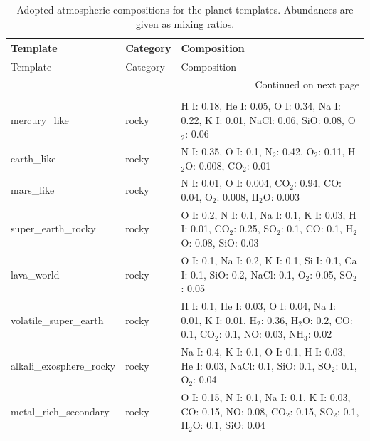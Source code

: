 \begin{longtable}{lll}
\caption{Adopted atmospheric compositions for the planet templates. Abundances are given as mixing ratios.} \\
\toprule
Template & Category & Composition \\
\midrule
\endfirsthead

\toprule
Template & Category & Composition \\
\midrule
\endhead

\midrule
\multicolumn{3}{r}{Continued on next page} \\
\midrule
\endfoot

\bottomrule
\endlastfoot

\multicolumn{3}{l}{\textbf{Rocky / terrestrial templates}} \\
\midrule
mercury\_like & rocky & H I: 0.18, He I: 0.05, O I: 0.34, Na I: 0.22, K I: 0.01, NaCl: 0.06, SiO: 0.08, O$_{2}$: 0.06 \\
earth\_like & rocky & N I: 0.35, O I: 0.1, N$_{2}$: 0.42, O$_{2}$: 0.11, H$_{2}$O: 0.008, CO$_{2}$: 0.01 \\
mars\_like & rocky & N I: 0.01, O I: 0.004, CO$_{2}$: 0.94, CO: 0.04, O$_{2}$: 0.008, H$_{2}$O: 0.003 \\
super\_earth\_rocky & rocky & O I: 0.2, N I: 0.1, Na I: 0.1, K I: 0.03, H I: 0.01, CO$_{2}$: 0.25, SO$_{2}$: 0.1, CO: 0.1, H$_{2}$O: 0.08, SiO: 0.03 \\
lava\_world & rocky & O I: 0.1, Na I: 0.2, K I: 0.1, Si I: 0.1, Ca I: 0.1, SiO: 0.2, NaCl: 0.1, O$_{2}$: 0.05, SO$_{2}$: 0.05 \\
volatile\_super\_earth & rocky & H I: 0.1, He I: 0.03, O I: 0.04, Na I: 0.01, K I: 0.01, H$_{2}$: 0.36, H$_{2}$O: 0.2, CO: 0.1, CO$_{2}$: 0.1, NO: 0.03, NH$_{3}$: 0.02 \\
alkali\_exosphere\_rocky & rocky & Na I: 0.4, K I: 0.1, O I: 0.1, H I: 0.03, He I: 0.03, NaCl: 0.1, SiO: 0.1, SO$_{2}$: 0.1, O$_{2}$: 0.04 \\
metal\_rich\_secondary & rocky & O I: 0.15, N I: 0.1, Na I: 0.1, K I: 0.03, CO: 0.15, NO: 0.08, CO$_{2}$: 0.15, SO$_{2}$: 0.1, H$_{2}$O: 0.1, SiO: 0.04 \\
\midrule


\end{longtable}
